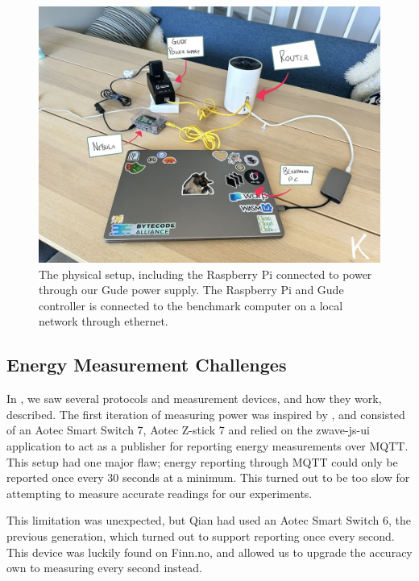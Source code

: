\documentclass[
  table]{report}
\begin{document}
\begin{figure}[H]
\centering
  \includegraphics{assets/6-physical_setup.jpg}
  \caption{The physical setup, including the Raspberry Pi connected to power
through our Gude power supply. The Raspberry Pi and Gude controller is connected
to the benchmark computer on a local network through ethernet.}
  \label{fig:physical_setup}
\end{figure}

\subsection{Energy Measurement Challenges}
\label{sect:energy_challenges}

In , we saw several protocols and
measurement devices, and how they work, described. The first iteration
of measuring power was inspired by
\citet{qianEnergyFootprintingWordPress2022}, and consisted of an Aotec
Smart Switch 7, Aotec Z-stick 7 and relied on the zwave-js-ui
application to act as a publisher for reporting energy measurements over
\ac{MQTT}. This setup had one major flaw; energy reporting through
\ac{MQTT} could only be reported once every 30 seconds at a minimum.
This turned out to be too slow for attempting to measure accurate
readings for our experiments.

This limitation was unexpected, but Qian had used an Aotec Smart Switch
6, the previous generation, which turned out to support reporting once
every second. This device was luckily found on Finn.no, and allowed us
to upgrade the accuracy own to measuring every second instead.
\end{document}
